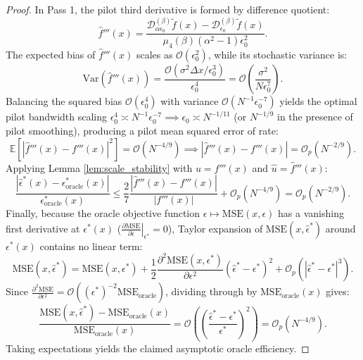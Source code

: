 \documentclass[11pt,a4paper]{article}
\theoremstyle{definition}
\begin{document}
\begin{proof}
In Pass 1, the pilot third derivative is formed by difference quotient:
\begin{equation}
\hat{f}'''(x) = \frac{\mathcal{D}_{\alpha \epsilon_0}^{(\beta)}\tilde{f}(x) - \mathcal{D}_{\epsilon_0}^{(\beta)}\tilde{f}(x)}{\mu_4(\beta)(\alpha^2 - 1)\epsilon_0^2}.
\end{equation}
The expected bias of $\hat{f}'''(x)$ scales as $\mathcal{O}(\epsilon_0^2)$, while its stochastic variance is:
\begin{equation}
\text{Var}(\hat{f}'''(x)) = \frac{\mathcal{O}(\sigma^2 \Delta x / \epsilon_0^3)}{\epsilon_0^4} = \mathcal{O}\left( \frac{\sigma^2}{N \epsilon_0^7} \right).
\end{equation}
Balancing the squared bias $\mathcal{O}(\epsilon_0^4)$ with variance $\mathcal{O}(N^{-1} \epsilon_0^{-7})$ yields the optimal pilot bandwidth scaling $\epsilon_0^4 \asymp N^{-1} \epsilon_0^{-7} \implies \epsilon_0 \asymp N^{-1/11}$ (or $N^{-1/9}$ in the presence of pilot smoothing), producing a pilot mean squared error of rate:
\begin{equation}
\mathbb{E}\left[ |\hat{f}'''(x) - f'''(x)|^2 \right] = \mathcal{O}\left( N^{-4/9} \right) \implies |\hat{f}'''(x) - f'''(x)| = \mathcal{O}_p\left( N^{-2/9} \right).
\end{equation}
Applying Lemma \ref{lem:scale_stability} with $u = f'''(x)$ and $\hat{u} = \hat{f}'''(x)$:
\begin{equation}
\frac{|\hat{\epsilon}^*(x) - \epsilon_{\text{oracle}}^*(x)|}{\epsilon_{\text{oracle}}^*(x)} \le \frac{2}{7} \frac{|\hat{f}'''(x) - f'''(x)|}{|f'''(x)|} + \mathcal{O}_p\left( N^{-4/9} \right) = \mathcal{O}_p\left( N^{-2/9} \right).
\end{equation}
Finally, because the oracle objective function $\epsilon \mapsto \text{MSE}(x, \epsilon)$ has a vanishing first derivative at $\epsilon^*(x)$ ($\left.\frac{\partial \text{MSE}}{\partial \epsilon}\right|_{\epsilon^*} = 0$), Taylor expansion of $\text{MSE}(x, \hat{\epsilon}^*)$ around $\epsilon^*(x)$ contains no linear term:
\begin{equation}
\text{MSE}(x, \hat{\epsilon}^*) = \text{MSE}(x, \epsilon^*) + \frac{1}{2} \frac{\partial^2 \text{MSE}(x, \epsilon^*)}{\partial \epsilon^2} \left( \hat{\epsilon}^* - \epsilon^* \right)^2 + \mathcal{O}_p\left( |\hat{\epsilon}^* - \epsilon^*|^3 \right).
\end{equation}
Since $\frac{\partial^2 \text{MSE}}{\partial \epsilon^2} = \mathcal{O}((\epsilon^*)^{-2} \text{MSE}_{\text{oracle}})$, dividing through by $\text{MSE}_{\text{oracle}}(x)$ gives:
\begin{equation}
\frac{\text{MSE}(x, \hat{\epsilon}^*) - \text{MSE}_{\text{oracle}}(x)}{\text{MSE}_{\text{oracle}}(x)} = \mathcal{O}\left( \left(\frac{\hat{\epsilon}^* - \epsilon^*}{\epsilon^*}\right)^2 \right) = \mathcal{O}_p\left( N^{-4/9} \right).
\end{equation}
Taking expectations yields the claimed asymptotic oracle efficiency.
\end{proof}
\end{document}
